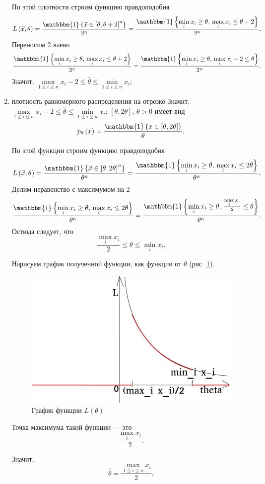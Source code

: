 \begin{enumerate}[label=\alph*)]
  По этой плотности строим функцию правдоподобия
  $$L \left( \vec{x}, \theta \right) =
    \frac{ \mathbbm{1} \left\{ \vec{x} \in \left[ \theta, \theta + 2 \right]^n \right\} }{2^n} =
    \frac{ \mathbbm{1} \left\{ \min \limits_i x_i \geq \theta, \, \max \limits_i x_i \leq \theta + 2 \right\} }{2^n}.$$
  Переносим 2 влево
  $$ \frac{ \mathbbm{1} \left\{ \min \limits_i x_i \geq \theta, \, \max \limits_i x_i \leq \theta + 2 \right\} }{2^n} =
    \frac{ \mathbbm{1} \left\{ \min \limits_i x_i \geq \theta, \, \max \limits_i x_i - 2 \leq \theta \right\} }{2^n}.$$
  Значит,
  $ \max \limits_{1 \leq i \leq n} x_i - 2 \leq
    \hat{ \theta } \leq
    \min \limits_{1 \leq i \leq n} x_i$;
  \item плотность равномерного распределения на отрезке
  Значит, $ \max \limits_{1 \leq i \leq n} x_i - 2 \leq \hat{ \theta } \leq \min \limits_{1 \leq i \leq n} x_i$;
  $ \left[ \theta, 2 \theta \right], \, \theta > 0$ имеет вид
  $$p_{ \theta } \left( x \right) =
    \frac{ \mathbbm{1} \left\{ x \in \left[ \theta, 2 \theta \right] \right\} }{ \theta }.$$

  По этой функции строим функцию правдоподобия
  $$L \left( \vec{x}, \theta \right) =
    \frac{ \mathbbm{1} \left\{ \vec{x} \in \left[ \theta, 2 \theta \right]^n \right\} }{ \theta^n} =
    \frac{ \mathbbm{1} \left\{ \min \limits_i x_i \geq \theta, \, \max \limits_i x_i \leq 2 \theta \right\} }{ \theta^n}.$$
  Делим неравенство с максимумом на 2
  $$ \frac{ \mathbbm{1} \left\{ \min \limits_i x_i \geq \theta, \, \max \limits_i x_i \leq 2 \theta \right\} }{ \theta^n} =
    \frac{ \mathbbm{1} \left\{ \min \limits_i x_i \geq \theta,\, \frac{ \max \limits_i x_i}{2} \leq \theta \right\} }{ \theta^n}.$$
  Остюда следует, что
  $$ \frac{ \max \limits_i x_i}{2} \leq
    \theta \leq
    \min \limits_i x_i.$$

  Нарисуем график полученной функции, как функции от $ \theta $ (рис. \ref{fig:4183}).

  \begin{figure}[h!]
    \centering
    \includegraphics[width=.4\textwidth]{./pictures/4_18_3.png}
    \caption{График функции $L \left( \theta \right) $}
    \label{fig:4183}
  \end{figure}

  Точка максимума такой функции --- это
  $$ \frac{ \max \limits_i x_i}{2}.$$

  Значит,
  $$ \hat{ \theta } =
    \frac{ \max \limits_{1 \leq i \leq n} x_i}{2}.$$
\end{enumerate}

